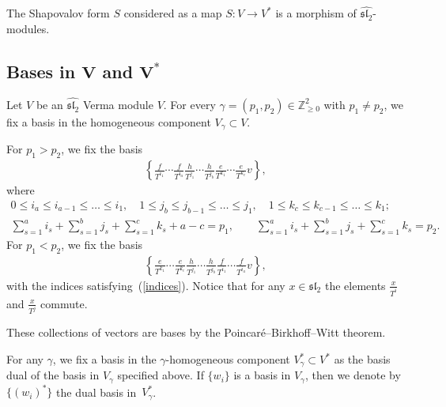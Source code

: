 The Shapovalov form $S$ considered as a map $S\colon V\longrightarrow V^*$ is a morphism of $\widehat{{\mathfrak{sl}_2}}$-modules.

\subsection[Bases in $V$ and $V^*$]{Bases in $\boldsymbol{V}$ and $\boldsymbol{V^*}$}\label{BASIS}
Let $V$ be an $\widehat{{\mathfrak{sl}_2}}$ Verma module $V$. For every $\gamma=(p_1,p_2)\in{\mathbb Z}^2_{\geq 0}$ with $p_1\ne p_2$, we fix a basis in the homogeneous component $V_{\gamma}\subset V$.

For $p_1>p_2$, we fix the basis
\begin{gather*}%
\left\{\frac{f}{T^{i_1}}\cdots \frac{f}{T^{i_a}} \frac{h}{T^{j_1}}\cdots\frac{h}{T^{j_b}} \frac{e}{T^{k_1}}\cdots\frac{e}{T^{k_c}}v \right\},
\end{gather*}
where
\begin{gather}
0\leq i_a\leq i_{a-1}\leq\dots\leq i_1,\quad 1\leq j_b\leq j_{b-1}\leq\dots\leq j_1,\quad 1\leq k_c\leq k_{c-1}\leq\dots\leq k_1; \nonumber\\
\sum_{s=1}^a i_s + \sum_{s=1}^b j_s + \sum_{s=1}^c k_s + a - c = p_1, \qquad \sum_{s=1}^a i_s + \sum_{s=1}^b j_s + \sum_{s=1}^c k_s = p_2.\label{indices}
\end{gather}
For $p_1 < p_2$, we fix the basis
\begin{gather*}%
\left\{\frac{e}{T^{k_1}}\cdots\frac{e}{T^{k_c}} \frac{h}{T^{j_1}}\cdots\frac{h}{T^{j_b}} \frac{f}{T^{i_1}}\cdots\frac{f}{T^{i_a}}v\right\},
\end{gather*}
with the indices satisfying~(\ref{indices}). Notice that for any $x\in\mathfrak{sl}_2$ the elements $\frac x{T^i}$ and $\frac x{T^j}$ commute.

These collections of vectors are bases by the Poincar\'{e}--Birkhoff--Witt theorem.

 For any $\gamma$, we fix a basis in the $\gamma$-homogeneous component $V_\gamma^*\subset V^*$ as the basis dual of the basis in $V_\gamma$ specified above.
If $\{w_i\}$ is a basis in $V_\gamma$, then we denote by $\{(w_i)^*\}$ the dual basis in~$V^*_\gamma$.

